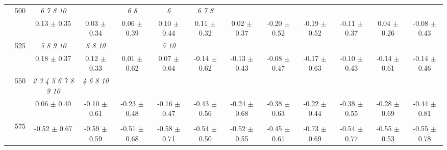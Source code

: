 \begin{table}[h]
{\begin{tabular}{
        ccccccccccccc}
 & \multirow{2}{*}{500}& \textit{  6  7  8 10 }& & \textit{ 6 8 }& \textit{ 6 }& \textit{ 6 7 8 }& & & & & &  \\ 
 & & 0.13 $\pm$ 0.35& 0.03 $\pm$ 0.34& 0.06 $\pm$ 0.39& 0.10 $\pm$ 0.44& 0.11 $\pm$ 0.32& 0.02 $\pm$ 0.37& -0.20 $\pm$ 0.52& -0.19 $\pm$ 0.52& -0.11 $\pm$ 0.37& 0.04 $\pm$ 0.26& -0.08 $\pm$ 0.43 \\ 
 & \multirow{2}{*}{525}& \cellcolor[HTML]{EFEFEF} \textit{  5  8  9 10 }& \cellcolor[HTML]{EFEFEF} \textit{  5  8 10 }& \cellcolor[HTML]{EFEFEF} & \cellcolor[HTML]{EFEFEF} \textit{  5 10 }& \cellcolor[HTML]{EFEFEF} & \cellcolor[HTML]{EFEFEF} & \cellcolor[HTML]{EFEFEF} & \cellcolor[HTML]{EFEFEF} & \cellcolor[HTML]{EFEFEF} & \cellcolor[HTML]{EFEFEF} & \cellcolor[HTML]{EFEFEF}  \\ 
 & & \cellcolor[HTML]{EFEFEF} 0.18 $\pm$ 0.37& \cellcolor[HTML]{EFEFEF} 0.12 $\pm$ 0.33& \cellcolor[HTML]{EFEFEF} 0.01 $\pm$ 0.62& \cellcolor[HTML]{EFEFEF} 0.07 $\pm$ 0.64& \cellcolor[HTML]{EFEFEF} -0.14 $\pm$ 0.62& \cellcolor[HTML]{EFEFEF} -0.13 $\pm$ 0.43& \cellcolor[HTML]{EFEFEF} -0.08 $\pm$ 0.47& \cellcolor[HTML]{EFEFEF} -0.17 $\pm$ 0.63& \cellcolor[HTML]{EFEFEF} -0.10 $\pm$ 0.43& \cellcolor[HTML]{EFEFEF} -0.14 $\pm$ 0.61& \cellcolor[HTML]{EFEFEF} -0.14 $\pm$ 0.46 \\ 
 & \multirow{2}{*}{550}& \textit{  2  3  4  5  6  7  8  9 10 }& \textit{  4  6  8 10 }& & & & & & & & &  \\ 
 & & 0.06 $\pm$ 0.40& -0.10 $\pm$ 0.61& -0.23 $\pm$ 0.48& -0.16 $\pm$ 0.47& -0.43 $\pm$ 0.56& -0.24 $\pm$ 0.68& -0.38 $\pm$ 0.63& -0.22 $\pm$ 0.44& -0.38 $\pm$ 0.55& -0.28 $\pm$ 0.69& -0.44 $\pm$ 0.81 \\ 
 & \multirow{2}{*}{575}& \cellcolor[HTML]{EFEFEF} & \cellcolor[HTML]{EFEFEF} & \cellcolor[HTML]{EFEFEF} & \cellcolor[HTML]{EFEFEF} & \cellcolor[HTML]{EFEFEF} & \cellcolor[HTML]{EFEFEF} & \cellcolor[HTML]{EFEFEF} & \cellcolor[HTML]{EFEFEF} & \cellcolor[HTML]{EFEFEF} & \cellcolor[HTML]{EFEFEF} & \cellcolor[HTML]{EFEFEF}  \\ 
 & & \cellcolor[HTML]{EFEFEF} -0.52 $\pm$ 0.67& \cellcolor[HTML]{EFEFEF} -0.59 $\pm$ 0.59& \cellcolor[HTML]{EFEFEF} -0.51 $\pm$ 0.68& \cellcolor[HTML]{EFEFEF} -0.58 $\pm$ 0.71& \cellcolor[HTML]{EFEFEF} -0.54 $\pm$ 0.50& \cellcolor[HTML]{EFEFEF} -0.52 $\pm$ 0.55& \cellcolor[HTML]{EFEFEF} -0.45 $\pm$ 0.61& \cellcolor[HTML]{EFEFEF} -0.73 $\pm$ 0.69& \cellcolor[HTML]{EFEFEF} -0.54 $\pm$ 0.77& \cellcolor[HTML]{EFEFEF} -0.55 $\pm$ 0.53& \cellcolor[HTML]{EFEFEF} -0.55 $\pm$ 0.78 \\ 

\end{tabular}}
\end{table}
